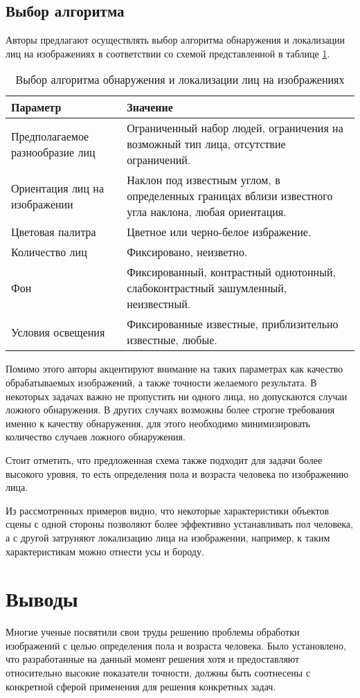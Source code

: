 \subsection{Выбор алгоритма}
Авторы \cite{Veznevec_Degtyareva} предлагают осуществлять выбор алгоритма
обнаружения и локализации лиц на изображениях в соответствии со схемой
представленной в таблице \ref{tab:chose_algo}.

\begin{table}[ht]
  \caption{Выбор алгоритма обнаружения и локализации лиц на изображениях}
  \begin{tabular}{|p{}|p{}|}
  \hline
  Параметр & Значение \\ 
  \hline
  Предполагаемое разнообразие лиц & Ограниченный набор людей, ограничения на
возможный тип лица, отсутствие ограничений. \\ 
  \hline
  Ориентация лиц на изображении & Наклон под известным
углом, в определенных границах вблизи известного угла наклона, любая
ориентация. \\
  \hline
  Цветовая палитра & Цветное или черно-белое избражение. \\
  \hline
  Количество лиц & Фиксировано, неизветно. \\
  \hline
  Фон & Фиксированный, контрастный однотонный, слабоконтрастный зашумленный,
неизвестный. \\
  \hline
  Условия освещения & Фиксированные известные, приблизительно известные, любые.
  \\
  \hline
  \end{tabular}
  \label{tab:chose_algo}
\end{table}

Помимо этого авторы акцентируют внимание на таких параметрах как качество
обрабатываемых изображений, а также точности желаемого результата. В некоторых
задачах важно не пропустить ни одного лица, но допускаются случаи ложного
обнаружения. В других случаях возможны более строгие требования именно к
качеству обнаружения, для этого необходимо минимизировать количество случаев
ложного обнаружения.

Стоит отметить, что предложенная схема также подходит для задачи более высокого
уровня, то есть определения пола и возраста человека по изображению лица.

Из рассмотренных примеров видно, что некоторые характеристики объектов сцены
с одной стороны позволяют более эффективно устанавливать пол человека, а с
другой затруняют локализацию лица на изображении, например, к таким
характеристикам можно отнести усы и бороду.

\section{Выводы}
Многие ученые посвятили свои труды решению проблемы обработки изображений с
целью определения пола и возраста человека. Было установлено, что разработанные
на данный момент решения хотя и предоставляют относительно высокие показатели
точности, должны быть соотнесены с конкретной сферой применения для решения
конкретных задач.



